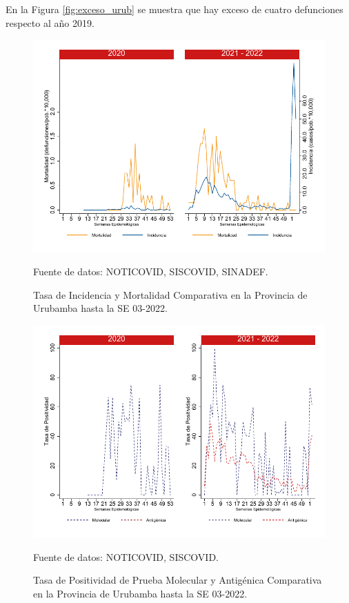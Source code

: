\documentclass[12pt,a4paper,openany]{book}
\begin{document}
		En la Figura \ref{fig:exceso_urub} se muestra que hay exceso de cuatro defunciones respecto al año 2019.
		
		\begin{figure}[h]
			\caption{Tasa de Incidencia y Mortalidad Comparativa en la Provincia de Urubamba hasta la SE 03-2022.}\label{fig:inc_urub}
			\begin{center}
				\includegraphics[width=0.7\linewidth]{../figuras/incidencia_mortalidad_20_21_13}
			\end{center}
			{\footnotesize {Fuente de datos: NOTICOVID, SISCOVID, SINADEF.}}
		\end{figure}
		
		\begin{figure}[h]
			\caption{Tasa de Positividad de Prueba Molecular y Antigénica Comparativa en la Provincia de Urubamba hasta la SE 03-2022.}\label{fig:positividad_urub}
			\begin{center}
				\includegraphics[width=0.7\linewidth]{../figuras/positividad_20_21_13}
			\end{center}
			{\footnotesize {Fuente de datos: NOTICOVID, SISCOVID.}}
		\end{figure}
		
\end{document}
